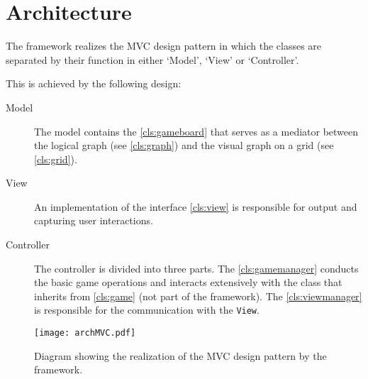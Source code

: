 \section{Architecture}
The \graphioli \gls{framework} realizes the \gls{MVC} design pattern in which the classes are separated by their function in either `Model', `View' or `Controller'.\par
This is achieved by the following design:\par

\begin{description}
	\item[Model] The model contains the \ref{cls:gameboard} that serves as a mediator between the logical \gls{graph} (see \ref{cls:graph}) and the visual graph on a \gls{grid} (see \ref{cls:grid}).
	\item[View] An implementation of the \gls{interface} \ref{cls:view} is responsible for output and capturing user interactions.
	\item[Controller] The controller is divided into three parts. The \ref{cls:gamemanager} conducts the basic game operations and interacts extensively with the class that inherits from \ref{cls:game} (not part of the framework). The \ref{cls:viewmanager} is responsible for the communication with the \texttt{View}.
\end{description}

\begin{figure}[h]
	\centering
	\texttt{[image: archMVC.pdf]}
	\caption{Diagram showing the realization of the \gls{MVC} design pattern by the framework.}
	\label{img:archMVC}
\end{figure}